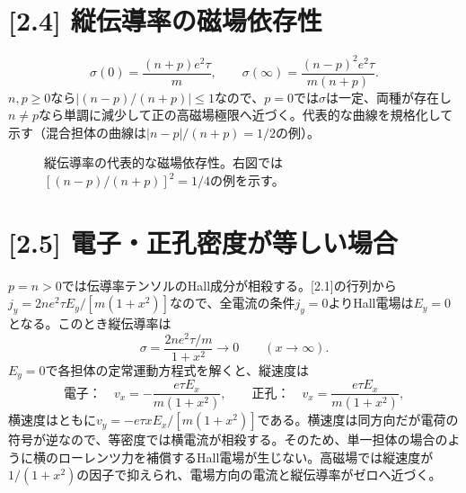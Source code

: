 \documentclass[11pt,a4paper]{article}
\begin{document}
\section*{[2.4] 縦伝導率の磁場依存性}
\begin{equation}
 \sigma(0)=\frac{(n+p)e^2\tau}{m},\qquad
 \sigma(\infty)=\frac{(n-p)^2e^2\tau}{m(n+p)}.
\end{equation}
$n,p\ge0$なら$|(n-p)/(n+p)|\le1$なので、$p=0$では$\sigma$は一定、両種が存在し$n\ne p$なら単調に減少して正の高磁場極限へ近づく。代表的な曲線を規格化して示す（混合担体の曲線は$|n-p|/(n+p)=1/2$の例）。
\begin{figure}[htbp]
\centering
{}
\caption{縦伝導率の代表的な磁場依存性。右図では$[(n-p)/(n+p)]^2=1/4$の例を示す。}
\end{figure}

\section*{[2.5] 電子・正孔密度が等しい場合}
$p=n>0$では伝導率テンソルのHall成分が相殺する。[2.1]の行列から$j_y=2ne^2\tau E_y/[m(1+x^2)]$なので、全電流の条件$j_y=0$よりHall電場は$E_y=0$となる。このとき縦伝導率は
\begin{equation}
 \sigma=\frac{2ne^2\tau/m}{1+x^2}\longrightarrow0\qquad(x\to\infty).
\end{equation}
$E_y=0$で各担体の定常運動方程式を解くと、縦速度は
\begin{equation}
 \text{電子：}\quad v_x=-\frac{e\tau E_x}{m(1+x^2)},\qquad
 \text{正孔：}\quad v_x=\frac{e\tau E_x}{m(1+x^2)},
\end{equation}
横速度はともに$v_y=-e\tau xE_x/[m(1+x^2)]$である。横速度は同方向だが電荷の符号が逆なので、等密度では横電流が相殺する。そのため、単一担体の場合のように横のローレンツ力を補償するHall電場が生じない。高磁場では縦速度が$1/(1+x^2)$の因子で抑えられ、電場方向の電流と縦伝導率がゼロへ近づく。
\end{document}
